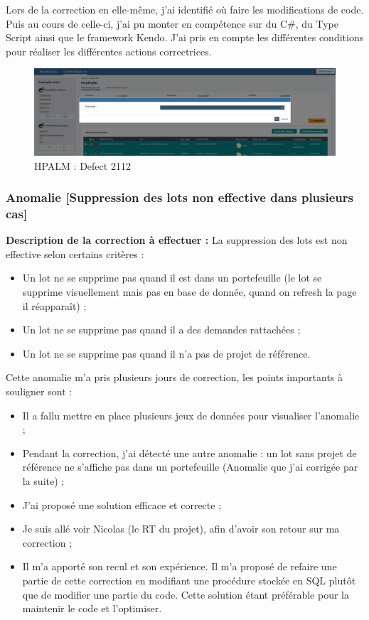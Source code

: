 Lors de la correction en elle-même, j'ai identifié où faire les modifications de code. Puis au cours de celle-ci, j'ai pu monter en compétence sur du C\#, du Type Script ainsi que le framework Kendo. J'ai pris en compte les différentes conditions pour réaliser les différentes actions correctrices. 

\begin{figure}[!h]
\centering
\includegraphics[width=1\textwidth]{images/correction1.PNG}
\caption{HPALM : Defect 2112}
\end{figure}

\subsubsection{Anomalie [Suppression des lots non effective dans plusieurs cas]}

\textbf{Description de la correction à effectuer :} 
La suppression des lots est non effective selon certains critères :
\begin{itemize}
    \item Un lot ne se supprime pas quand il est dans un portefeuille (le lot se supprime visuellement mais pas en base de donnée, quand on refresh la page il réapparaît) ;
    \item Un lot ne se supprime pas quand il a des demandes rattachées ;
    \item Un lot ne se supprime pas quand il n'a pas de projet de référence.
\end{itemize}

Cette anomalie m'a pris plusieurs jours de correction, les points importants à souligner sont : 
\begin{itemize}
    \item Il a fallu mettre en place plusieurs jeux de données pour visualiser l'anomalie ;
    \item Pendant la correction, j'ai détecté une autre anomalie : un lot sans projet de référence ne s'affiche pas dans un portefeuille (Anomalie que j'ai corrigée par la suite) ;
    \item J'ai proposé une solution efficace et correcte ;
    \item Je suis allé voir Nicolas (le RT du projet), afin d'avoir son retour sur ma correction ;
    \item Il m'a apporté son recul et son expérience. Il m'a proposé de refaire une partie de cette correction en modifiant une procédure stockée en SQL plutôt que de modifier une partie du code. Cette solution étant préférable pour la maintenir le code et l'optimiser.
\end{itemize}

